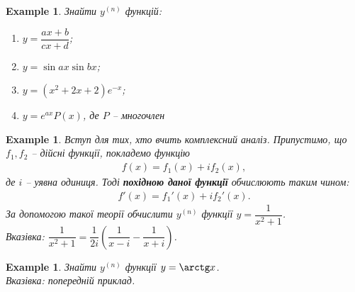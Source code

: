 \documentclass[a4paper, 14pt]{article}
\theoremstyle{theoremdd}
\theoremstyle{theoremdd}
\theoremstyle{theoremdd}
\theoremstyle{theoremdd}
\newtheorem{example}[theorem]{Example}
\theoremstyle{theoremdd}
\theoremstyle{theoremdd}
\theoremstyle{theoremdd}
\theoremstyle{theoremdd}
\theoremstyle{theoremdd}
\begin{document}
\begin{example}
Знайти $y^{(n)}$ функцій:
\begin{enumerate}[nosep,wide=0pt,label={\arabic*)}]
\item $y = \dfrac{ax+b}{cx+d}$;
\item $y = \sin ax \sin bx$;
\item $y = (x^2+2x+2) e^{-x}$;
\item $y = e^{ax} P(x)$, де $P$ -- многочлен
\end{enumerate} 
\end{example}

\begin{example}
Вступ для тих, хто вчить \textit{комплексний аналіз}. Припустимо, що $f_1,f_2$ -- дійсні функції, покладемо функцію
\begin{align*}
f(x) = f_1(x) + i f_2(x),
\end{align*}
де $i$ -- уявна одиниця. Тоді \textbf{похідною даної функції} обчислюють таким чином:
\begin{align*}
f'(x) = f_1'(x) + i f_2'(x).
\end{align*}
За допомогою такої теорії обчислити $y^{(n)}$ функції $y = \dfrac{1}{x^2+1}$.\\
\textit{Вказівка: $\dfrac{1}{x^2+1} = \dfrac{1}{2i} \left( \dfrac{1}{x-i} - \dfrac{1}{x+i} \right)$}.
\end{example}

\begin{example}
Знайти $y^{(n)}$ функції $y = \arctg x$.\\
\textit{Вказівка: попередній приклад.}
\end{example}
\end{document}

